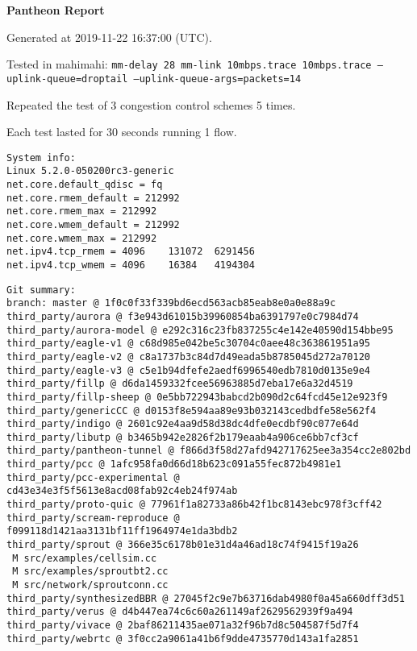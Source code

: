 \documentclass{article}
\begin{document}
\centerline{\textbf{\large{Pantheon Report}}}
\vspace{20pt}

Generated at 2019-11-22 16:37:00 (UTC).

Tested in mahimahi: \texttt{mm-delay 28 mm-link 10mbps.trace 10mbps.trace --uplink-queue=droptail --uplink-queue-args=packets=14}

Repeated the test of 3 congestion control schemes 5 times.

Each test lasted for 30 seconds running 1 flow.

\begin{verbatim}
System info:
Linux 5.2.0-050200rc3-generic
net.core.default_qdisc = fq
net.core.rmem_default = 212992
net.core.rmem_max = 212992
net.core.wmem_default = 212992
net.core.wmem_max = 212992
net.ipv4.tcp_rmem = 4096	131072	6291456
net.ipv4.tcp_wmem = 4096	16384	4194304
\end{verbatim}

\begin{verbatim}
Git summary:
branch: master @ 1f0c0f33f339bd6ecd563acb85eab8e0a0e88a9c
third_party/aurora @ f3e943d61015b39960854ba6391797e0c7984d74
third_party/aurora-model @ e292c316c23fb837255c4e142e40590d154bbe95
third_party/eagle-v1 @ c68d985e042be5c30704c0aee48c363861951a95
third_party/eagle-v2 @ c8a1737b3c84d7d49eada5b8785045d272a70120
third_party/eagle-v3 @ c5e1b94dfefe2aedf6996540edb7810d0135e9e4
third_party/fillp @ d6da1459332fcee56963885d7eba17e6a32d4519
third_party/fillp-sheep @ 0e5bb722943babcd2b090d2c64fcd45e12e923f9
third_party/genericCC @ d0153f8e594aa89e93b032143cedbdfe58e562f4
third_party/indigo @ 2601c92e4aa9d58d38dc4dfe0ecdbf90c077e64d
third_party/libutp @ b3465b942e2826f2b179eaab4a906ce6bb7cf3cf
third_party/pantheon-tunnel @ f866d3f58d27afd942717625ee3a354cc2e802bd
third_party/pcc @ 1afc958fa0d66d18b623c091a55fec872b4981e1
third_party/pcc-experimental @ cd43e34e3f5f5613e8acd08fab92c4eb24f974ab
third_party/proto-quic @ 77961f1a82733a86b42f1bc8143ebc978f3cff42
third_party/scream-reproduce @ f099118d1421aa3131bf11ff1964974e1da3bdb2
third_party/sprout @ 366e35c6178b01e31d4a46ad18c74f9415f19a26
 M src/examples/cellsim.cc
 M src/examples/sproutbt2.cc
 M src/network/sproutconn.cc
third_party/synthesizedBBR @ 27045f2c9e7b63716dab4980f0a45a660dff3d51
third_party/verus @ d4b447ea74c6c60a261149af2629562939f9a494
third_party/vivace @ 2baf86211435ae071a32f96b7d8c504587f5d7f4
third_party/webrtc @ 3f0cc2a9061a41b6f9dde4735770d143a1fa2851
\end{verbatim}
\end{document}
